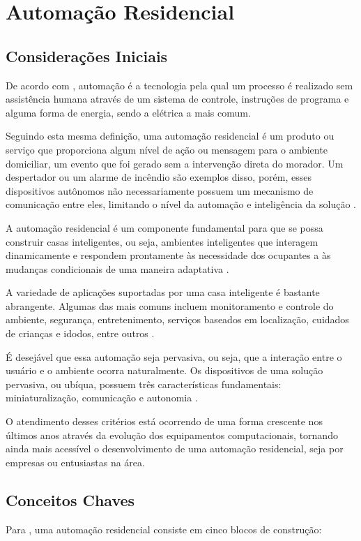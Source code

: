 \chapter{Automação Residencial}
\label{cap:2}

\section{Considerações Iniciais}
De acordo com , automação é a tecnologia pela qual um processo é realizado
sem assistência humana através de um sistema de controle, instruções de programa e alguma forma de energia,
sendo a elétrica a mais comum.

Seguindo esta mesma definição, uma automação residencial é um produto ou serviço que proporciona algum nível de
ação ou mensagem para o ambiente domiciliar, um evento que foi gerado sem a intervenção direta do morador. Um
despertador ou um alarme de incêndio são exemplos disso, porém, esses dispositivos autônomos não
necessariamente possuem um mecanismo de comunicação entre eles, limitando o nível da automação e inteligência
da solução \cite{riley2012}.

A automação residencial é um componente fundamental para que se possa construir casas inteligentes, ou seja,
ambientes inteligentes que interagem dinamicamente e respondem prontamente às necessidade dos ocupantes a às
mudanças condicionais de uma maneira adaptativa \cite{al-qutayri2010}.

A variedade de aplicações suportadas por uma casa inteligente é bastante abrangente. Algumas das mais comuns incluem
monitoramento e controle do ambiente, segurança, entretenimento, serviços baseados em localização, cuidados
de crianças e idodos, entre outros \cite{al-qutayri2010}.

É desejável que essa automação seja pervasiva, ou seja, que a interação entre o usuário e o ambiente ocorra
naturalmente. Os dispositivos de uma solução pervasiva, ou ubíqua, possuem três características fundamentais:
miniaturalização, comunicação e autonomia \cite{lalanda2010}.

O atendimento desses critérios está ocorrendo de uma forma crescente nos últimos anos através da evolução dos
equipamentos computacionais, tornando ainda mais acessível o desenvolvimento de uma automação residencial,
seja por empresas ou entusiastas na área.

\section{Conceitos Chaves}
Para , uma automação residencial consiste em cinco blocos de construção:

